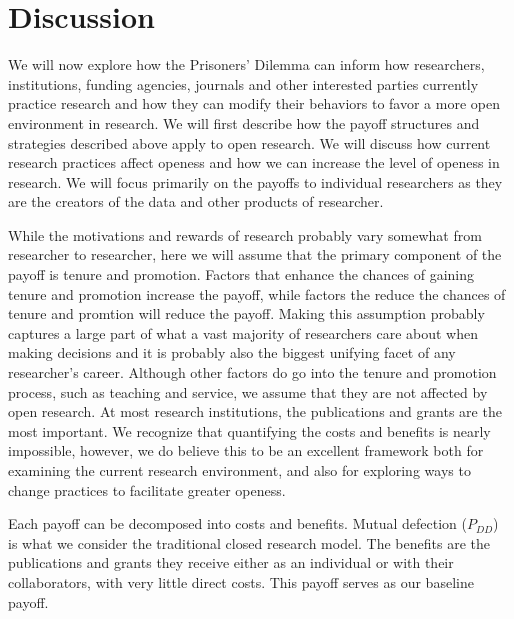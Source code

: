 \documentclass[11pt]{article} %
\begin{document}
\section{Discussion}
We will now explore how the Prisoners' Dilemma can inform how researchers, institutions, funding agencies, journals and other interested parties currently practice research and how they can modify their behaviors to favor a more open environment in research. We will first describe how the payoff structures and strategies described above apply to open research. We will discuss how current research practices affect openess and how we can increase the level of openess in research. We will focus primarily on the payoffs to individual researchers as they are the creators of the data and other products of researcher.

While the motivations and rewards of research probably vary somewhat from researcher to researcher, here we will assume that the primary component of the payoff is tenure and promotion. Factors that enhance the chances of gaining tenure and promotion increase the payoff, while factors the reduce the chances of tenure and promtion will reduce the payoff. Making this assumption probably captures a large part of what a vast majority of researchers care about when making decisions and it is probably also the biggest unifying facet of any researcher's career. Although other factors do go into the tenure and promotion process, such as teaching and service, we assume that they are not affected by open research.  At most research institutions, the publications and grants are the most important. We recognize that quantifying the costs and benefits is nearly impossible, however, we do believe this to be an excellent framework both for examining the current research environment, and also for exploring ways to change practices to facilitate greater openess.

Each payoff can be decomposed into costs and benefits. Mutual defection ($P_{DD}$) is what we  consider the traditional closed research model. The benefits are the publications and grants they receive either as an individual or with their collaborators, with very little direct costs. This payoff serves as our baseline payoff. 
\end{document}
